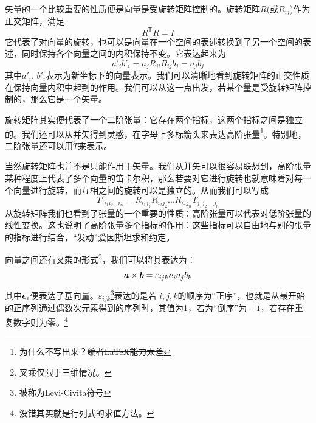 \documentclass[12pt,a4paper,openany,twoside]{book}
\numberwithin{equation}{section}
\begin{document}
          矢量的一个比较重要的性质便是向量是受旋转矩阵控制的。旋转矩阵$R$(或$R_{ij}$)作为正交矩阵，满足
          \begin{equation*}
            R^\mathsf{T} R = I
          \end{equation*}
          它代表了对向量的旋转，也可以是向量在一个空间的表述转换到了另一个空间的表述，同时保持各个向量之间的内积保持不变。它表达起来为
          \begin{equation*}
            a'_i b'_i = a_j R_{ji} R_{ij} b_j = a_j b_j
          \end{equation*} 
          其中$a'_i,\,b'_i$表示为新坐标下的向量表示。我们可以清晰地看到旋转矩阵的正交性质在保持向量内积中起到的作用。我们可以从这一点出发，若某个量是受旋转矩阵控制的，那么它是一个矢量。

          旋转矩阵其实便代表了一个二阶张量：它存在两个指标，这两个指标之间是独立的。我们还可以从并矢得到灵感，在字母上多标箭头来表达高阶张量\footnote{为什么不写出来？\sout{编者\LaTeX 能力太差}}。特别地，二阶张量还可以用$\overleftrightarrow{T}$来表示。

          当然旋转矩阵也并不是只能作用于矢量。我们从并矢可以很容易联想到，高阶张量某种程度上代表了多个向量的笛卡尔积，那么若要对它进行旋转也就意味着对每一个向量进行旋转，而互相之间的旋转可以是独立的。从而我们可以写成
          \begin{equation*}
            T'_{i_1i_2...i_n} = R_{i_1j_1} R_{i_2j_2} ... R_{i_n j_n} T_{j_1j_2....j_n}
          \end{equation*} 
          从旋转矩阵我们也看到了张量的一个重要的性质：高阶张量可以代表对低阶张量的线性变换。这也说明了高阶张量多个指标的作用：这些指标可以自由地与别的张量的指标进行结合，“发动”爱因斯坦求和约定。

          向量之间还有叉乘的形式\footnote{叉乘仅限于三维情况。}，我们可以将其表达为：
          \begin{equation*}
            \vb*{a} \times \vb*{b} = \varepsilon_{ijk} \vb*{e}_i a_j b_k
          \end{equation*} 
          其中$\vb*{e}_i$便表达了基向量。$\varepsilon_{ijk}$\footnote{被称为Levi-Civita符号}表达的是若 $i,j,k$的顺序为“正序”，也就是从最开始的正序列通过偶数次元素得到的序列时，其值为1，若为“倒序”为 $-1$，若存在重复数字则为零。\footnote{没错其实就是行列式的求值方法。}
\end{document}
